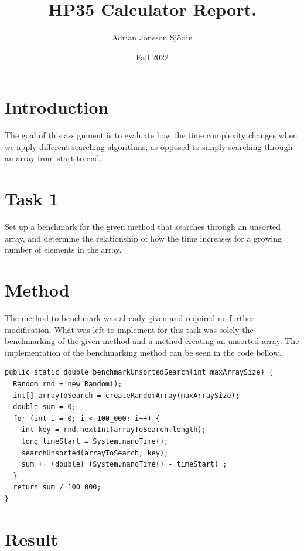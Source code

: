 \documentclass[a4paper,11pt]{article}
\begin{document}
\title{
  \textbf{HP35 Calculator Report.}
}
\author{Adrian Jonsson Sjödin}
\date{Fall 2022}

\maketitle

\section*{Introduction}
The goal of this assignment is to evaluate how the time complexity changes when we apply different searching algorithms, as opposed to simply
searching through an array from start to end.
\section*{Task 1}

Set up a benchmark for the given method that searches through an unsorted array, and determine the relationship of how the time increases for a
growing number of elements in the array.

\section*{Method}

The method to benchmark was already given and required no further modification. What was left to implement for this task was solely the benchmarking
of the given method and a method creating an unsorted array. The implementation of the
benchmarking method can be seen in the code bellow.

\begin{verbatim}
public static double benchmarkUnsortedSearch(int maxArraySize) {
  Random rnd = new Random();
  int[] arrayToSearch = createRandomArray(maxArraySize);
  double sum = 0;
  for (int i = 0; i < 100_000; i++) {
    int key = rnd.nextInt(arrayToSearch.length);
    long timeStart = System.nanoTime();
    searchUnsorted(arrayToSearch, key);
    sum += (double) (System.nanoTime() - timeStart) ;
  }
  return sum / 100_000;
}
\end{verbatim}

\section*{Result}
\end{document}
